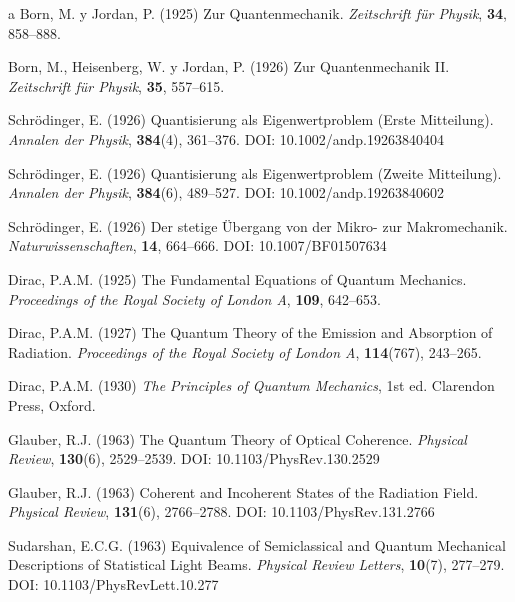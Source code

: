 \documentclass[11pt,a4paper,spanish]{book}
\begin{document}
\begin{thebibliography}{a}
		 Born, M. y Jordan, P. (1925) Zur Quantenmechanik. \textit{Zeitschrift für Physik}, \textbf{34}, 858--888.
		
		 Born, M., Heisenberg, W. y Jordan, P. (1926) Zur Quantenmechanik II. \textit{Zeitschrift für Physik}, \textbf{35}, 557--615.
		
		 Schrödinger, E. (1926) Quantisierung als Eigenwertproblem (Erste Mitteilung). \textit{Annalen der Physik}, \textbf{384}(4), 361--376. DOI: 10.1002/andp.19263840404
		
		 Schrödinger, E. (1926) Quantisierung als Eigenwertproblem (Zweite Mitteilung). \textit{Annalen der Physik}, \textbf{384}(6), 489--527. DOI: 10.1002/andp.19263840602
		
		 Schrödinger, E. (1926) Der stetige Übergang von der Mikro- zur Makromechanik. \textit{Naturwissenschaften}, \textbf{14}, 664--666. DOI: 10.1007/BF01507634
		
		 Dirac, P.A.M. (1925) The Fundamental Equations of Quantum Mechanics. \textit{Proceedings of the Royal Society of London A}, \textbf{109}, 642--653.
		
		 Dirac, P.A.M. (1927) The Quantum Theory of the Emission and Absorption of Radiation. \textit{Proceedings of the Royal Society of London A}, \textbf{114}(767), 243--265.
		
		 Dirac, P.A.M. (1930) \emph{The Principles of Quantum Mechanics}, 1st ed. Clarendon Press, Oxford.
		
		 Glauber, R.J. (1963) The Quantum Theory of Optical Coherence. \textit{Physical Review}, \textbf{130}(6), 2529--2539. DOI: 10.1103/PhysRev.130.2529
		
		 Glauber, R.J. (1963) Coherent and Incoherent States of the Radiation Field. \textit{Physical Review}, \textbf{131}(6), 2766--2788. DOI: 10.1103/PhysRev.131.2766
		
		 Sudarshan, E.C.G. (1963) Equivalence of Semiclassical and Quantum Mechanical Descriptions of Statistical Light Beams. \textit{Physical Review Letters}, \textbf{10}(7), 277--279. DOI: 10.1103/PhysRevLett.10.277
		
		

\end{thebibliography}
\end{document}
